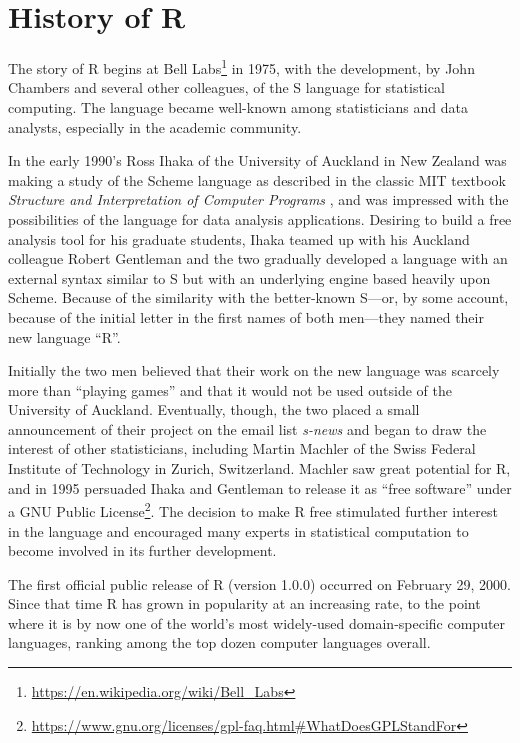 \documentclass[]{book}
\let\rmarkdownfootnote\footnote%
\def\footnote{\protect\rmarkdownfootnote}
\renewcommand{\href}[2]{#2\footnote{\url{#1}}}
\renewcommand{\href}[2]{#2\footnote{\url{#1}}}
\theoremstyle{definition}
\theoremstyle{definition}
\theoremstyle{remark}
\begin{document}
\section{History of R}\label{history-of-r}

The story of R begins at
\href{https://en.wikipedia.org/wiki/Bell_Labs}{Bell Labs} in 1975, with
the development, by John Chambers and several other colleagues, of the S
language for statistical computing. The language became well-known among
statisticians and data analysts, especially in the academic community.

In the early 1990's Ross Ihaka of the University of Auckland in New
Zealand was making a study of the Scheme language as described in the
classic MIT textbook \emph{Structure and Interpretation of Computer
Programs} \citep{AbelsonSussman}, and was impressed with the
possibilities of the language for data analysis applications. Desiring
to build a free analysis tool for his graduate students, Ihaka teamed up
with his Auckland colleague Robert Gentleman and the two gradually
developed a language with an external syntax similar to S but with an
underlying engine based heavily upon Scheme. Because of the similarity
with the better-known S---or, by some account, because of the initial
letter in the first names of both men---they named their new language
``R''.

Initially the two men believed that their work on the new language was
scarcely more than ``playing games'' and that it would not be used
outside of the University of Auckland. Eventually, though, the two
placed a small announcement of their project on the email list
\emph{s-news} and began to draw the interest of other statisticians,
including Martin Machler of the Swiss Federal Institute of Technology in
Zurich, Switzerland. Machler saw great potential for R, and in 1995
persuaded Ihaka and Gentleman to release it as ``free software'' under a
\href{https://www.gnu.org/licenses/gpl-faq.html\#WhatDoesGPLStandFor}{GNU
Public License}. The decision to make R free stimulated further interest
in the language and encouraged many experts in statistical computation
to become involved in its further development.

The first official public release of R (version 1.0.0) occurred on
February 29, 2000. Since that time R has grown in popularity at an
increasing rate, to the point where it is by now one of the world's most
widely-used domain-specific computer languages, ranking among the top
dozen computer languages overall.
\end{document}
